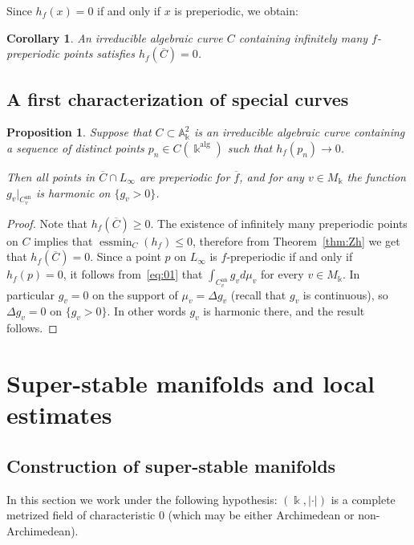 \documentclass[11 pt, oneside, a4paper]{amsart}
\newcommand{\nA}{\mathbb{A}}
\newcommand{\ol}{\overline}
\newcommand{\nk}{\Bbbk}
\DeclareMathOperator{\an}{an}
\DeclareMathOperator{\alg}{alg}
\DeclareMathOperator{\essmin}{\mathrm{essmin}}
\newtheorem{cor}[thm]{Corollary}
\newtheorem{prop}[thm]{Proposition}
\theoremstyle{definition}
\theoremstyle{definition}
\begin{document}
Since $h_f(x)=0$ if and only if $x$ is preperiodic, we obtain:
\begin{cor}
An  irreducible algebraic curve $C$ containing infinitely many $f$-preperiodic points satisfies $h_f(\overline{C})=0$.
\end{cor}


\subsection{A first characterization of special curves}
\begin{prop}\label{prop:Green_harmonic}
Suppose that $C \subset \nA_\nk^2$ is an irreducible algebraic curve
containing a sequence of distinct points $p_n \in C(\nk^{\alg})$ such that 
$h_f(p_n) \to 0$. 

Then all points in $\ol{C} \cap L_\infty$ are preperiodic for $\ol{f}$, and for any $v\in M_\nk$ 
the function $g_v|_{C^{\an}_v}$ is harmonic on $\{g_v >0\}$.
\end{prop}

\begin{proof}
Note that $h_f(\overline{C}) \ge0$.   
{The existence of infinitely many preperiodic points on $C$  implies  that $\essmin_C(h_f) \le 0$, 
therefore from Theorem~\ref{thm:Zh} we get that 
$h_f(\overline{C}) =0$.  Since a point $p$ on $L_\infty$  is $f$-preperiodic if and only if $h_f(p)=0$, it follows from~\eqref{eq:01}
that $\int_{C^{\an}_v}  g_v d \mu_v$ for every $v\in   M_\nk$. In particular 
$g_v =0$ on the support of $\mu_v=\Delta g_v$ (recall that $g_v$ is continuous), so
 $\Delta g_v=0$ on $\{g_v>0\}$. In other words $g_v$ is harmonic there, and the result follows.} 
\end{proof}


\section{Super-stable manifolds and local estimates}\label{sec:super-stable}


\subsection{Construction of super-stable manifolds}
In this section we work under the following hypothesis:
$(\nk,|\cdot|)$
 is a complete metrized field of characteristic $0$ (which may be either Archimedean 
or non-Archimedean).  
\end{document}
